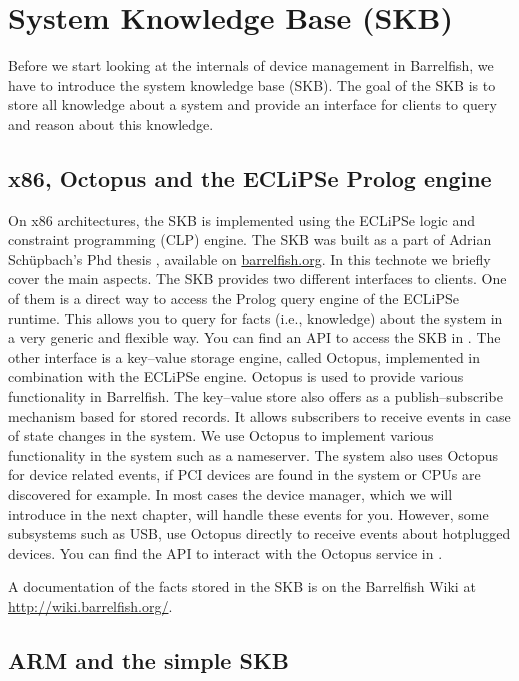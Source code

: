 \documentclass[a4paper,11pt,twoside]{report}
\begin{document}
\chapter{System Knowledge Base (SKB)}

Before we start looking at the internals of device management in Barrelfish,
we have to introduce the system knowledge base (SKB). The goal of the SKB
is to store all knowledge about a system and provide an interface for
clients to query and reason about this knowledge.

\section{x86, Octopus and the ECLiPSe Prolog engine}

On x86 architectures, the SKB is implemented using the ECLiPSe logic and
constraint programming (CLP) engine. The SKB was built as a part of Adrian
Sch\"upbach's Phd thesis \cite{}, available on \url{barrelfish.org}. In this
technote we briefly cover the main aspects. The SKB provides two different
interfaces to clients. One of them is a direct way to access the Prolog query
engine of the ECLiPSe runtime. This allows you to query for facts (i.e.,
knowledge) about the system in a very generic and flexible way. You can find
an API to access the SKB in . The other interface is a key--value storage engine, called Octopus, implemented in combination with
the ECLiPSe engine. Octopus is used to provide various functionality in
Barrelfish. The key--value store also offers as a publish--subscribe mechanism
based for stored records. It allows subscribers to receive events in case
of state changes in the system. We use Octopus to implement various
functionality in the system such as a nameserver. The system also uses Octopus
for device related events, if PCI devices are found in the system or CPUs
are discovered for example. In most cases the device manager, which we will
introduce in the next chapter, will handle these events for you. However, some
subsystems such as USB, use Octopus directly to receive events about
hotplugged devices. You can find the API to interact with the Octopus service
in .

A documentation of the facts stored in the SKB is on the Barrelfish
Wiki at \url{http://wiki.barrelfish.org/}.


\section{ARM and the simple SKB}
\label{sec:simpleskb}
\end{document}
